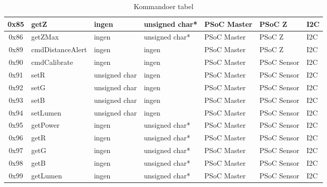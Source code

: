 \begin{table}[H]
\begin{tabular}{|c|l|l|l|l|l|l|}
    \hline
        0x85 &
        getZ &
        ingen &
        unsigned char* &
        PSoC Master &
        PSoC Z &
        I2C \\
    \hline
        0x86 &
        getZMax &
        ingen &
        unsigned char* &
        PSoC Master &
        PSoC Z &
        I2C \\
    \hline
        0x89 &
        cmdDistanceAlert &
        ingen &
        ingen &
        PSoC Master &
        PSoC Z &
        I2C \\
    \hline
        0x90 &
        cmdCalibrate &
        ingen &
        ingen &
        PSoC Master &
        PSoC Sensor &
        I2C \\
    \hline
        0x91 &
        setR &
        unsigned char &
        ingen &
        PSoC Master &
        PSoC Sensor &
        I2C \\
    \hline
        0x92 &
        setG &
        unsigned char &
        ingen &
        PSoC Master &
        PSoC Sensor &
        I2C \\
    \hline
        0x93 &
        setB &
        unsigned char &
        ingen &
        PSoC Master &
        PSoC Sensor &
        I2C \\
    \hline
        0x94 &
        setLumen &
        unsigned char &
        ingen &
        PSoC Master &
        PSoC Sensor &
        I2C \\
    \hline
        0x95 &
        getPower &
        ingen &
        unsigned char* &
        PSoC Master &
        PSoC Sensor &
        I2C \\
    \hline
        0x96 &
        getR &
        ingen &
        unsigned char* &
        PSoC Master &
        PSoC Sensor &
        I2C \\
    \hline
        0x97 &
        getG &
        ingen &
        unsigned char* &
        PSoC Master &
        PSoC Sensor &
        I2C \\
    \hline
        0x98 &
        getB &
        ingen &
        unsigned char* &
        PSoC Master &
        PSoC Sensor &
        I2C \\
    \hline
        0x99 &
        getLumen &
        ingen &
        unsigned char* &
        PSoC Master &
        PSoC Sensor &
        I2C \\
    \hline
    \end{tabular}
    \caption{Kommandoer tabel}
    \label{tab:kommandoTabel}
\end{table}